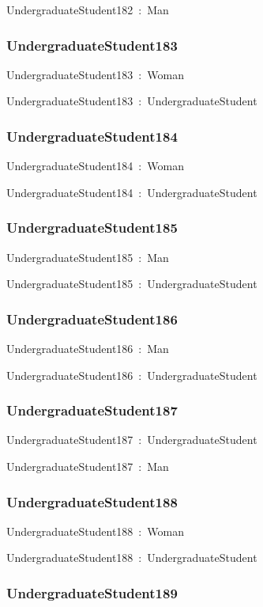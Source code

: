 \documentclass{article}
\begin{document}
UndergraduateStudent182~:~Man

\subsubsection*{UndergraduateStudent183}

UndergraduateStudent183~:~Woman

UndergraduateStudent183~:~UndergraduateStudent

\subsubsection*{UndergraduateStudent184}

UndergraduateStudent184~:~Woman

UndergraduateStudent184~:~UndergraduateStudent

\subsubsection*{UndergraduateStudent185}

UndergraduateStudent185~:~Man

UndergraduateStudent185~:~UndergraduateStudent

\subsubsection*{UndergraduateStudent186}

UndergraduateStudent186~:~Man

UndergraduateStudent186~:~UndergraduateStudent

\subsubsection*{UndergraduateStudent187}

UndergraduateStudent187~:~UndergraduateStudent

UndergraduateStudent187~:~Man

\subsubsection*{UndergraduateStudent188}

UndergraduateStudent188~:~Woman

UndergraduateStudent188~:~UndergraduateStudent

\subsubsection*{UndergraduateStudent189}
\end{document}
